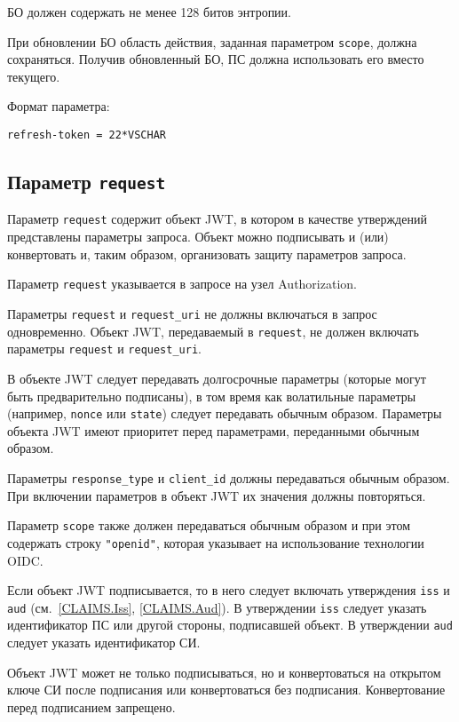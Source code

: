 БО должен содержать не менее 128 битов энтропии.

При обновлении БО область действия, заданная параметром \lstinline{scope}, 
должна сохраняться.
%
Получив обновленный БО, ПС должна использовать его вместо текущего.

Формат параметра:
\begin{lstlisting}
refresh-token = 22*VSCHAR
\end{lstlisting}

\subsection{Параметр \lstinline{request}}\label{PARAMS.Request} 

Параметр \lstinline{request} содержит объект JWT, в котором в качестве утверждений
представлены параметры запроса. Объект можно подписывать и (или) 
конвертовать и, таким образом, организовать защиту параметров запроса.

Параметр \lstinline{request} указывается в запросе на узел Authorization.

Параметры \lstinline{request} и \lstinline{request_uri} не должны включаться в 
запрос одновременно. 
%
Объект JWT, передаваемый в \lstinline{request}, не должен включать 
параметры \lstinline{request} и \lstinline{request_uri}.

В объекте JWT следует передавать долгосрочные параметры (которые могут быть 
предварительно подписаны), в том время как волатильные параметры (например,
\lstinline{nonce} или \lstinline{state}) следует передавать обычным образом. 
%
Параметры объекта JWT имеют приоритет перед параметрами, переданными обычным 
образом.

Параметры \lstinline{response_type} и \lstinline{client_id} должны передаваться
обычным образом. При включении параметров в объект JWT их значения должны
повторяться.

Параметр \lstinline{scope} также должен передаваться обычным образом и при 
этом содержать строку \lstinline{"openid"}, которая указывает на использование 
технологии OIDC.

Если объект JWT подписывается, то в него следует включать утверждения 
\lstinline{iss} и \lstinline{aud} (см.~\ref{CLAIMS.Iss}, \ref{CLAIMS.Aud}).
%
В утверждении \lstinline{iss} следует указать идентификатор ПС или другой 
стороны, подписавшей объект.
%
В утверждении \lstinline{aud} следует указать идентификатор СИ.

Объект JWT может не только подписываться, но и конвертоваться на открытом ключе 
СИ после подписания или конвертоваться без подписания. Конвертование перед 
подписанием запрещено.

